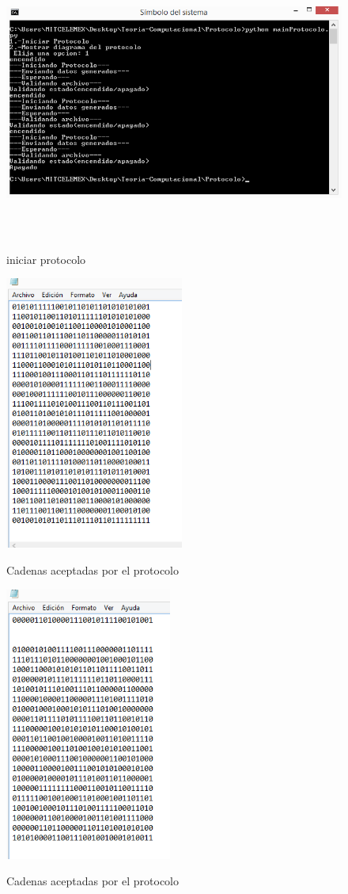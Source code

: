 \documentclass[12pt,letterpaper]{article}
\begin{document}
\begin{figure}[H]
\includegraphics[width=\textwidth, height=9cm]{inicioProtocolo.png}
\label{fig:protocolo}
\caption{iniciar protocolo}
\end{figure}

\begin{figure}[H]
\includegraphics[width=\textwidth, height=9cm]{textoProtocolo.png}
\label{fig:protocoloTexto}
\caption{Cadenas aceptadas por el protocolo}
\end{figure}

\begin{figure}[H]
\includegraphics[width=\textwidth, height=9cm]{textoProtocoloFin.png}
\label{fig:protocoloTexto2}
\caption{Cadenas aceptadas por el protocolo}
\end{figure}
\end{document}
